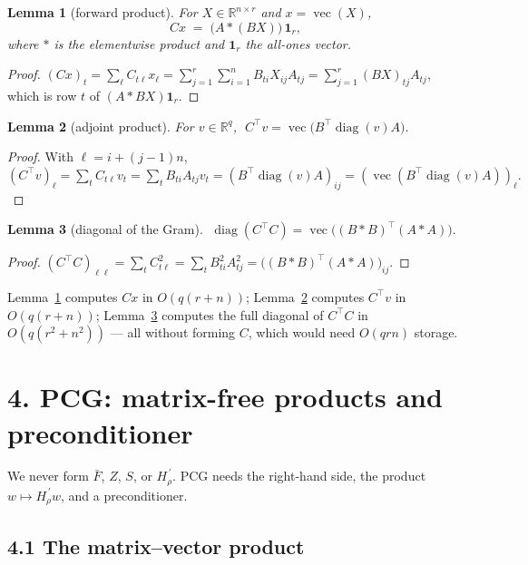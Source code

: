 \documentclass[11pt]{article}
\newcommand{\R}{\mathbb{R}}
\newcommand{\vecop}{\operatorname{vec}}
\newcommand{\diag}{\operatorname{diag}}
\newcommand{\had}{\ast}            %
\newcommand{\bF}{\bar F}
\newtheorem{lemma}{Lemma}
\begin{document}
\begin{lemma}[forward product]\label{lem:Cx}
For $X\in\R^{n\times r}$ and $x=\vecop(X)$,
\[
  Cx \;=\; \bigl(A\had (BX)\bigr)\,\mathbf 1_r,
\]
where $\had$ is the elementwise product and $\mathbf 1_r$ the all-ones vector.
\end{lemma}
\begin{proof}
$(Cx)_t=\sum_{\ell}C_{t\ell}x_\ell=\sum_{j=1}^r\sum_{i=1}^n B_{ti}X_{ij}A_{tj}
 =\sum_{j=1}^r (BX)_{tj}A_{tj}$, which is row $t$ of $(A\had BX)\mathbf 1_r$.
\end{proof}

\begin{lemma}[adjoint product]\label{lem:CTv}
For $v\in\R^q$, $\;C^{\!\top}v=\vecop\!\bigl(B^{\!\top}\diag(v)A\bigr).$
\end{lemma}
\begin{proof}
With $\ell=i+(j-1)n$,
$(C^{\!\top}v)_\ell=\sum_t C_{t\ell}v_t=\sum_t B_{ti}A_{tj}v_t
 =(B^{\!\top}\diag(v)A)_{ij}=(\vecop(B^{\!\top}\diag(v)A))_\ell.$
\end{proof}

\begin{lemma}[diagonal of the Gram]\label{lem:diag}
$\;\diag(C^{\!\top}C)=\vecop\!\bigl((B\had B)^{\!\top}(A\had A)\bigr).$
\end{lemma}
\begin{proof}
$(C^{\!\top}C)_{\ell\ell}=\sum_t C_{t\ell}^2=\sum_t B_{ti}^2A_{tj}^2
 =\bigl((B\had B)^{\!\top}(A\had A)\bigr)_{ij}.$
\end{proof}

\noindent Lemma~\ref{lem:Cx} computes $Cx$ in $O(q(r+n))$; Lemma~\ref{lem:CTv}
computes $C^{\!\top}v$ in $O(q(r+n))$; Lemma~\ref{lem:diag} computes the full
diagonal of $C^{\!\top}C$ in $O(q(r^2+n^2))$ — all without forming $C$, which
would need $O(qrn)$ storage.

\section*{4. PCG: matrix-free products and preconditioner}

We never form $\bF$, $Z$, $S$, or $H_\rho^{\,\prime}$. PCG needs the
right-hand side, the product $w\mapsto H_\rho^{\,\prime}w$, and a
preconditioner.

\subsection*{4.1 The matrix--vector product}
\end{document}
